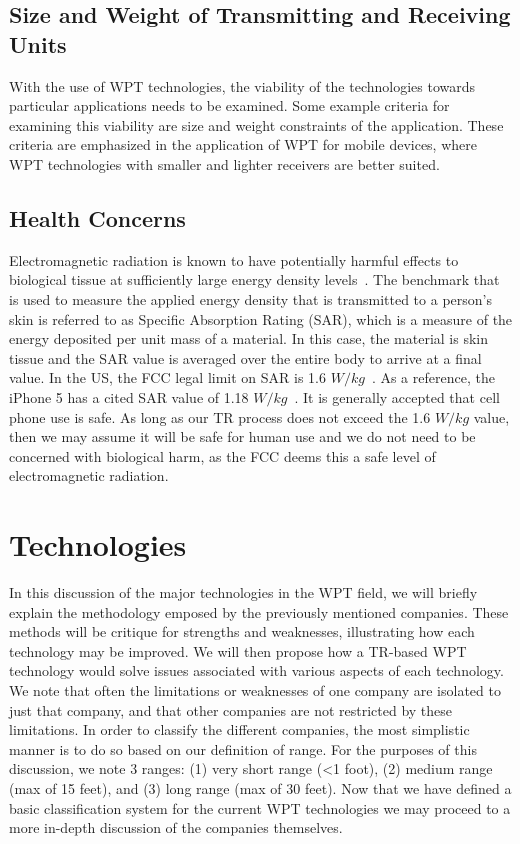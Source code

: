 \subsection{Size and Weight of Transmitting and Receiving Units}

With the use of WPT technologies, the viability of the technologies towards particular applications needs to be examined. Some example criteria for examining this viability are size and weight constraints of the application. These criteria are emphasized in the application of WPT for mobile devices, where WPT technologies with smaller and lighter receivers are better suited.

\subsection{Health Concerns}

Electromagnetic radiation is known to have potentially harmful effects to biological tissue at sufficiently large energy density levels~\cite{adey1993biological}. The benchmark that is used to measure the applied energy density that is transmitted to a person's skin is referred to as Specific Absorption Rating (SAR), which is a measure of the energy deposited per unit mass of a material. In this case, the material is skin tissue and the SAR value is averaged over the entire body to arrive at a final value. In the US, the FCC legal limit on SAR is 1.6 $W/kg$~\cite{procon2015}. As a reference, the iPhone 5 has a cited SAR value of 1.18 $W/kg$~\cite{procon2015}. It is generally accepted that cell phone use is safe. As long as our TR process does not exceed the 1.6 $W/kg$ value, then we may assume it will be safe for human use and we do not need to be concerned with biological harm, as the FCC deems this a safe level of electromagnetic radiation.

\section{Technologies}
\label{sec:lit-review-tech}
In this discussion of the major technologies in the WPT field, we will briefly explain the methodology emposed by the previously mentioned companies. These methods will be critique for strengths and weaknesses, illustrating how each technology may be improved. We will then propose how a TR-based WPT technology would solve issues associated with various aspects of each technology. We note that often the limitations or weaknesses of one company are isolated to just that company, and that other companies are not restricted by these limitations.
In order to classify the different companies, the most simplistic manner is to do so based on our definition of range. For the purposes of this discussion, we note 3 ranges: (1) very short range (<1 foot), (2) medium range (max of 15 feet), and (3) long range (max of 30 feet). Now that we have defined a basic classification system for the current WPT technologies we may proceed to a more in-depth discussion of the companies themselves.

